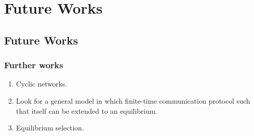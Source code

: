 \documentclass[8pt]{beamer}
\begin{document}
%
%
%
%
%
%
%
%
%
%


\section{Future Works}
\subsection{Future Works}


\begin{frame}

\frametitle{Further works}


\begin{enumerate}
\item Cyclic networks.
\item Look for a general model in which finite-time communication protocol such that itself can be extended to an equilibrium.
\item Equilibrium selection.  

\end{enumerate}
\end{frame}
\end{document}
